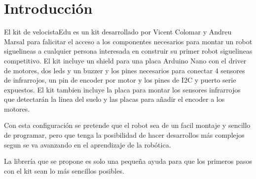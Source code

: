\hypertarget{index_intro_sec}{}\section{Introducción}\label{index_intro_sec}
El kit de velocista\-Edu es un kit desarrollado por Vicent Colomar y Andreu Marsal para falicitar el acceso a los componentes necesarios para montar un robot siguelineas a cualquier persona interesada en construir su primer robot siguelineas competitivo. El kit incluye un shield para una placa Arduino Nano con el driver de motores, dos leds y un buzzer y los pines necesarios para conectar 4 sensores de infrarrojos, un pin de encoder por motor y los pines de I2\-C y puerto serie expuestos. El kit tambien incluye la placa para montar los sensores infrarrojos que detectarán la linea del suelo y las placas para añadir el encoder a los motores.

Con esta configuración se pretende que el robot sea de un facil montaje y sencillo de programar, pero que tenga la posibilidad de hacer desarrollos más complejos segun se va avanzando en el aprendizaje de la robótica.

La librería que se propone es solo una pequeña ayuda para que los primeros pasos con el kit sean lo más sencillos posibles.

